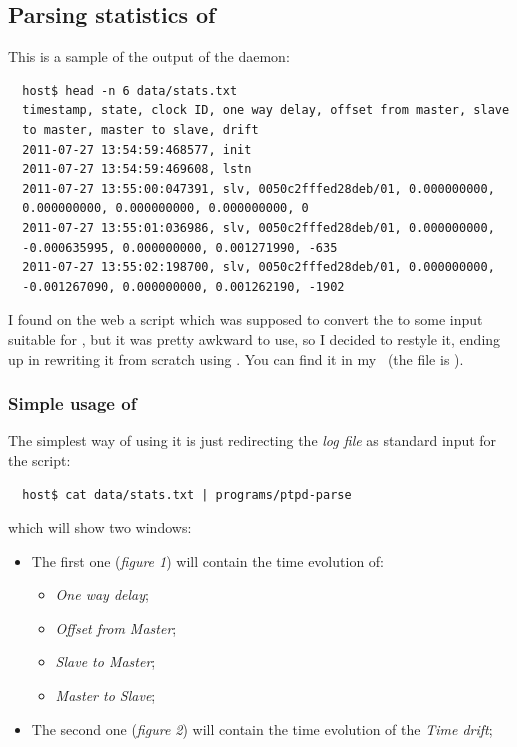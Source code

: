     \subsection{ Parsing statistics of \PTPd }

        This is a sample of the output of the daemon:
\begin{lstlisting}
  host$ head -n 6 data/stats.txt
  timestamp, state, clock ID, one way delay, offset from master, slave
  to master, master to slave, drift
  2011-07-27 13:54:59:468577, init
  2011-07-27 13:54:59:469608, lstn
  2011-07-27 13:55:00:047391, slv, 0050c2fffed28deb/01, 0.000000000,
  0.000000000, 0.000000000, 0.000000000, 0
  2011-07-27 13:55:01:036986, slv, 0050c2fffed28deb/01, 0.000000000,
  -0.000635995, 0.000000000, 0.001271990, -635
  2011-07-27 13:55:02:198700, slv, 0050c2fffed28deb/01, 0.000000000,
  -0.001267090, 0.000000000, 0.001262190, -1902
\end{lstlisting}

        I found on the web a  script which was supposed
        to convert the  to some input suitable for
        , but it was pretty awkward to use, so I decided
        to restyle it, ending up in rewriting it from scratch using
        . You can find it in my \MyRepo\ (the file is
        ).

\newpage
        \subsubsection{Simple usage of }

            The simplest way of using it is just redirecting the \emph{log
            file} as standard input for the script:
\begin{lstlisting}
  host$ cat data/stats.txt | programs/ptpd-parse
\end{lstlisting}
            which will show two windows:
            \begin{itemize}
            \item   The first one (\emph{figure 1}) will contain the time
                    evolution of:
                \begin{itemize}
                \item   \emph{One way delay};
                \item   \emph{Offset from Master};
                \item   \emph{Slave to Master};
                \item   \emph{Master to Slave};
                \end{itemize}
            \item   The second one (\emph{figure 2}) will contain the time
                    evolution of the \emph{Time drift};
            \end{itemize}

